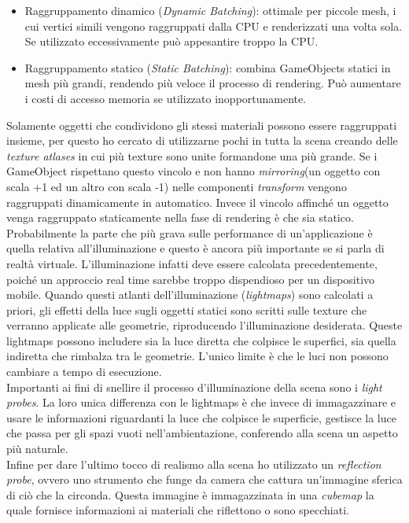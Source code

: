 \begin{itemize}
	\item Raggruppamento dinamico (\textit{Dynamic Batching}): ottimale per piccole mesh, i cui vertici simili vengono raggruppati dalla CPU e renderizzati una volta sola. Se utilizzato eccessivamente può appesantire troppo la CPU.
	\item Raggruppamento statico (\textit{Static Batching}): combina GameObjects statici in  mesh più grandi, rendendo più veloce il processo di rendering. Può aumentare i costi di accesso memoria se utilizzato inopportunamente.
\end{itemize} 
Solamente oggetti che condividono gli stessi materiali possono essere raggruppati insieme, per questo ho cercato di utilizzarne pochi in tutta la scena creando delle \textit{texture atlases} in cui più texture sono unite formandone una più grande. Se i GameObject rispettano questo vincolo e non hanno \textit{mirroring}(un oggetto con scala +1 ed un altro con scala -1) nelle componenti \textit{transform} vengono raggruppati dinamicamente in automatico. Invece il vincolo affinché un oggetto venga raggruppato staticamente nella fase di rendering è che sia statico. \\

Probabilmente la parte che più grava sulle performance di un'applicazione è quella relativa all'illuminazione e questo è ancora più importante se si parla di realtà virtuale. L'illuminazione infatti deve essere calcolata precedentemente, poiché un approccio real time sarebbe troppo dispendioso per un dispositivo mobile. Quando questi atlanti dell'illuminazione (\textit{lightmaps}) sono calcolati a priori, gli effetti della luce sugli oggetti statici sono scritti sulle texture che verranno applicate alle geometrie, riproducendo l'illuminazione desiderata. Queste lightmaps possono includere sia la luce diretta che colpisce le superfici, sia quella indiretta che rimbalza tra le geometrie. L'unico limite è che le luci non possono cambiare a tempo di esecuzione. \\
Importanti ai fini di snellire il processo d'illuminazione della scena sono i \textit{light probes}. La loro unica differenza con le lightmaps è che invece di immagazzinare e usare le informazioni riguardanti la luce che colpisce le superficie, gestisce la luce che passa per gli spazi vuoti nell'ambientazione, conferendo alla scena un aspetto più naturale. \\
Infine per dare l'ultimo tocco di realismo alla scena ho utilizzato un \textit{reflection probe}, ovvero uno strumento che funge da camera che cattura un'immagine sferica di ciò che la circonda. Questa immagine è immagazzinata in una \textit{cubemap} la quale fornisce informazioni ai materiali che riflettono o sono specchiati.\\

